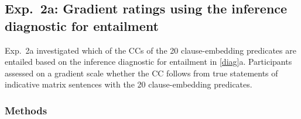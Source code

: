 \documentclass{language}
\newcommand{\jd}[1]{\textbf{\textcolor{Pink}{[jd: #1]}}}
\newcommand{\6}{\mbox{$[\hspace*{-.6mm}[$}}
\newcommand{\9}{\mbox{$]\hspace*{-.6mm}]$}}
\begin{document}
\subsection{Exp.~2a: Gradient ratings using the inference diagnostic for entailment}\label{s31}

Exp.~2a investigated which of the CCs of the 20 clause-embedding predicates are entailed based on the inference diagnostic for entailment in \ref{diag}a. Participants assessed on a gradient scale whether the CC follows from true statements of indicative matrix sentences with the 20 clause-embedding predicates.


%

\subsubsection{Methods}
\end{document}

